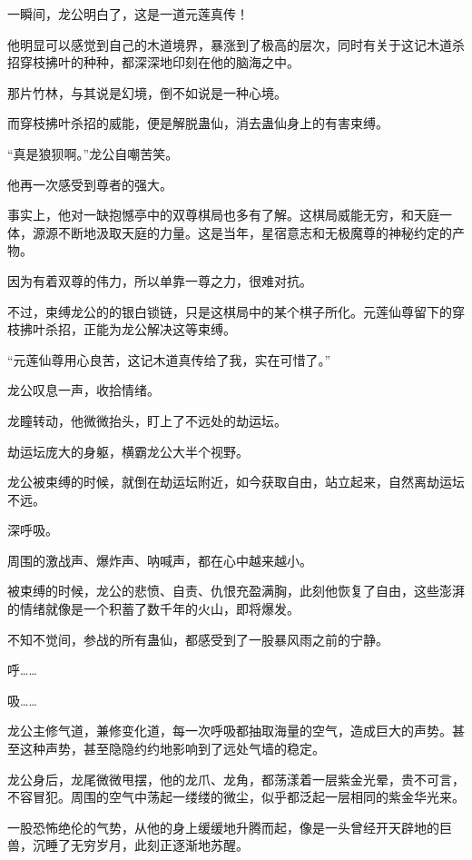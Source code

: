 
\begin{this_body}

一瞬间，龙公明白了，这是一道元莲真传！

他明显可以感觉到自己的木道境界，暴涨到了极高的层次，同时有关于这记木道杀招穿枝拂叶的种种，都深深地印刻在他的脑海之中。

那片竹林，与其说是幻境，倒不如说是一种心境。

而穿枝拂叶杀招的威能，便是解脱蛊仙，消去蛊仙身上的有害束缚。

“真是狼狈啊。”龙公自嘲苦笑。

他再一次感受到尊者的强大。

事实上，他对一缺抱憾亭中的双尊棋局也多有了解。这棋局威能无穷，和天庭一体，源源不断地汲取天庭的力量。这是当年，星宿意志和无极魔尊的神秘约定的产物。

因为有着双尊的伟力，所以单靠一尊之力，很难对抗。

不过，束缚龙公的的银白锁链，只是这棋局中的某个棋子所化。元莲仙尊留下的穿枝拂叶杀招，正能为龙公解决这等束缚。

“元莲仙尊用心良苦，这记木道真传给了我，实在可惜了。”

龙公叹息一声，收拾情绪。

龙瞳转动，他微微抬头，盯上了不远处的劫运坛。

劫运坛庞大的身躯，横霸龙公大半个视野。

龙公被束缚的时候，就倒在劫运坛附近，如今获取自由，站立起来，自然离劫运坛不远。

深呼吸。

周围的激战声、爆炸声、呐喊声，都在心中越来越小。

被束缚的时候，龙公的悲愤、自责、仇恨充盈满胸，此刻他恢复了自由，这些澎湃的情绪就像是一个积蓄了数千年的火山，即将爆发。

不知不觉间，参战的所有蛊仙，都感受到了一股暴风雨之前的宁静。

呼……

吸……

龙公主修气道，兼修变化道，每一次呼吸都抽取海量的空气，造成巨大的声势。甚至这种声势，甚至隐隐约约地影响到了远处气墙的稳定。

龙公身后，龙尾微微甩摆，他的龙爪、龙角，都荡漾着一层紫金光晕，贵不可言，不容冒犯。周围的空气中荡起一缕缕的微尘，似乎都泛起一层相同的紫金华光来。

一股恐怖绝伦的气势，从他的身上缓缓地升腾而起，像是一头曾经开天辟地的巨兽，沉睡了无穷岁月，此刻正逐渐地苏醒。


\end{this_body}
